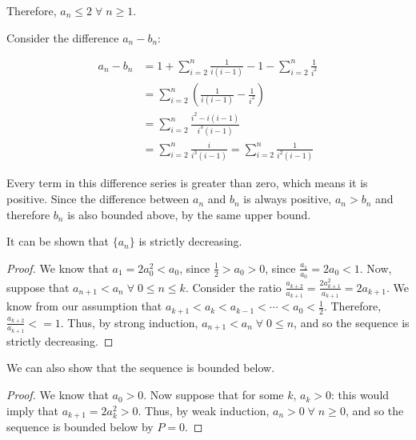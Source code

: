 Therefore, $a_n \leq 2 \;\forall\; n \geq 1$.

Consider the difference $a_n - b_n$:

\begin{align*}
  a_n - b_n &= 1 + \sum_{i = 2}^n \frac{1}{i(i - 1)} - 1 - \sum_{i = 2}^n \frac{1}{i^2} \\
  &= \sum_{i = 2}^n \left(\frac{1}{i(i - 1)} - \frac{1}{i^2}\right) \\
  &= \sum_{i = 2}^n \frac{i^2 - i(i - 1)}{i^3(i - 1)} \\
  &= \sum_{i = 2}^n \frac{i}{i^3(i - 1)} = \sum_{i = 2}^n \frac{1}{i^2(i - 1)}
\end{align*}

Every term in this difference series is greater than zero, which means it is positive. Since the difference between $a_n$ and $b_n$ is always positive, $a_n > b_n$ and therefore $b_n$ is also bounded above, by the same upper bound.


It can be shown that $\{a_n\}$ is strictly decreasing.
\begin{proof}
  We know that $a_1 = 2a_0^2 < a_0$, since $\frac{1}{2} > a_0 > 0$, since $\frac{a_1}{a_0} = 2a_0 < 1$. Now, suppose that $a_{n + 1} < a_n \;\forall\; 0 \leq n \leq k$. Consider the ratio $\frac{a_{k + 2}}{a_{k + 1}} = \frac{2a_{k + 1}^2}{a_{k + 1}} = 2a_{k + 1}$. We know from our assumption that $a_{k + 1} < a_k < a_{k - 1} < \cdots < a_0 < \frac{1}{2}$. Therefore, $\frac{a_{k + 2}}{a_{k + 1}} < = 1$. Thus, by strong induction, $a_{n + 1} < a_n \;\forall\; 0 \leq n$, and so the sequence is strictly decreasing.
\end{proof}

We can also show that the sequence is bounded below.
\begin{proof}
  We know that $a_0 > 0$. Now suppose that for some $k$, $a_k > 0$: this would imply that $a_{k + 1} = 2a_k^2 > 0$. Thus, by weak induction, $a_n > 0 \;\forall\; n \geq 0$, and so the sequence is bounded below by $P = 0$.
\end{proof}


